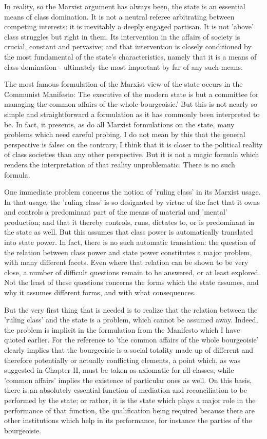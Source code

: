 In reality, so the Marxist argument has always been, the state  is an essential means of class domination. It is not a neutral referee arbitrating between competing interests: it is inevitably a deeply engaged partisan. It is not 'above' class struggles but right in them. Its intervention in the affairs of society is crucial, constant and pervasive; and that intervention is closely conditioned by the most fundamental of the state's characteristics, namely that it is a means of class domination - ultimately the most important by far of any such means.

The most famous formulation of the Marxist view of the state occurs in the Communist Manifesto: The executive of the modern state is but a committee for managing the common affairs of the whole bourgeoisie.' But this is not nearly so simple and straightforward a formulation as it has commonly been interpreted to be. In fact, it presents, as do all Marxist formulations on the state, many problems which need careful probing. I do not mean by this that the general perspective is false: on the contrary, I think that it is closer to the political reality of class societies than any other perspective. But it is not a magic formula which renders the interpretation of that reality unproblematic. There is no such formula.

One immediate problem concerns the notion of 'ruling class' in its Marxist usage. In that usage, the 'ruling class' is so designated by virtue of the fact that it owns and controls a predominant part of the means of material and 'mental' production; and that it thereby controls, runs, dictates to, or is predominant in the state as well. But this assumes that class power is automatically translated into state power. In fact, there is no such automatic translation: the question of the relation between class power and state power constitutes a major problem, with many different facets. Even where that relation can be shown to be very close, a number of difficult questions remain to be answered, or at least explored. Not the least of these questions concerns the forms which the state assumes, and why it assumes different forms, and with what consequences.

But the very first thing that is needed is to realize that the relation between the 'ruling class' and the state is a problem, which cannot be assumed away. Indeed, the problem is implicit in the formulation from the Manifesto which I have quoted earlier. For the reference to 'the common affairs of the whole bourgeoisie' clearly implies that the bourgeoisie is a social totality made up of different and therefore potentially or actually conflicting elements, a point which, as was suggested in Chapter II, must be taken as axiomatic for all classes; while 'common affairs' implies the existence of particular ones as well. On this basis, there is an absolutely essential function of mediation and reconciliation to be performed by the state; or rather, it is the state which plays a major role in the performance of that function, the qualification being required because there are other institutions which help in its performance, for instance the parties of the bourgeoisie.

